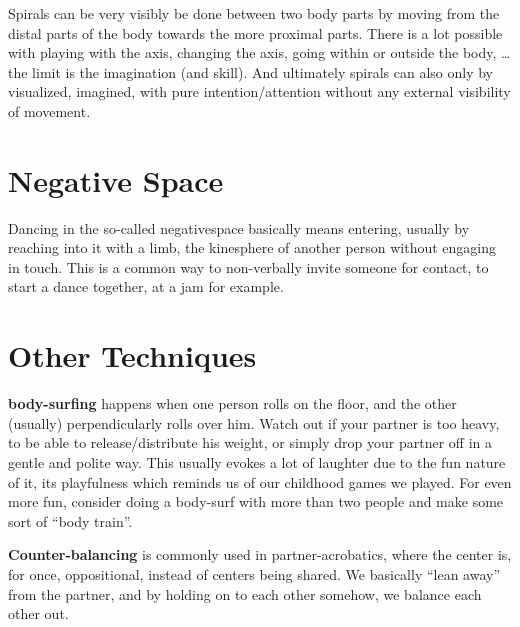 Spirals can be very visibly be done between two body parts by moving from the distal parts of the body towards the more proximal parts.
There is a lot possible with playing with the axis, changing the axis, going within or outside the body, \ldots the limit is the imagination (and skill).
And ultimately spirals can also only by visualized, imagined, with pure intention/attention without any external visibility of movement.


\section{Negative Space}\label{sec:negative-space}

Dancing in the so-called \gls{negativespace} basically means entering, usually by reaching into it with a limb, the \gls{kinesphere} of another person without engaging in touch.
This is a common way to non-verbally invite someone for contact, to start a dance together, at a jam for example.

\section{Other Techniques}\label{sec:other-techniques}

\textbf{\Gls{body-surfing}} happens when one person rolls on the floor, and the other (usually) perpendicularly rolls over him.
Watch out if your partner is too heavy, to be able to release/distribute his weight, or simply drop your partner off in a gentle and polite way.
This usually evokes a lot of laughter due to the fun nature of it, its playfulness which reminds us of our childhood games we played.
For even more fun, consider doing a body-surf with more than two people and make some sort of ``body train''.

\textbf{Counter-balancing} is commonly used in partner-acrobatics, where the center is, for once, oppositional, instead of centers being shared.
We basically ``lean away'' from the partner, and by holding on to each other somehow, we balance each other out.
